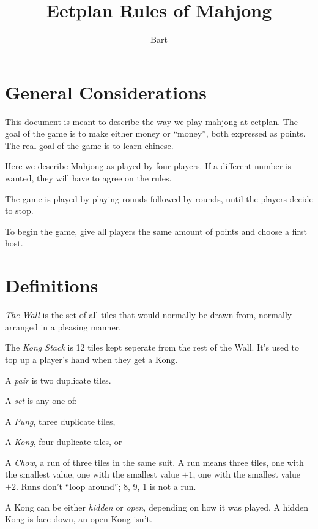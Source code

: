 \documentclass{article}
\begin{document}
\title{Eetplan Rules of Mahjong}
\author{Bart}
\maketitle

\section{General Considerations}
This document is meant to describe the way we play mahjong at eetplan. The goal of the game is to make either money or ``money'', both expressed as points. The real goal of the game is to learn chinese.

Here we describe Mahjong as played by four players. If a different number is wanted, they will have to agree on the rules.

The game is played by playing rounds followed by rounds, until the players decide to stop.

To begin the game, give all players the same amount of points and choose a first host.

\section{Definitions}
\emph{The Wall} is the set of all tiles that would normally be drawn from, normally arranged in a pleasing manner.

The \emph{Kong Stack} is 12 tiles kept seperate from the rest of the Wall. It's used to top up a player's hand when they get a Kong.

A \emph{pair} is two duplicate tiles.

A \emph{set} is any one of:
\begin{enumerate*}
    \item A \emph{Pung}, three duplicate tiles,
    \item A \emph{Kong}, four duplicate tiles, or
    \item A \emph{Chow}, a run of three tiles in the same suit. A run means three tiles, one with the smallest value, one with the smallest value $+1$, one with the smallest value $+2$. Runs don't ``loop around''; 8, 9, 1 is not a run.
\end{enumerate*}

A Kong can be either \emph{hidden} or \emph{open}, depending on how it was played. A hidden Kong is face down, an open Kong isn't.
\end{document}
